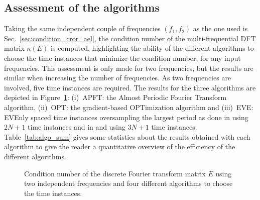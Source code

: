 \subsection{Assessment of the algorithms}
Taking the same independent couple of frequencies $(f_1, f_2)$ as the one
used is Sec.~\ref{sec:condition_cror_ael}, the condition number of the
multi-frequential DFT matrix $\kappa (E)$ is computed, highlighting
the ability of the different algorithms to choose the time instances that
minimize the condition number, for any input frequencies. This
assessment is only made for two frequencies, but the results are similar
when increasing the number of frequencies. As two frequencies are
involved, five time instances are required. The results for the three
algorithms are depicted in Figure~\ref{fig:bench_algo}: (i)~APFT: the
Almost Periodic Fourier Transform algorithm, (ii)~OPT: the
gradient-based OPTimization algorithm and (iii)~EVE: EVEnly spaced
time instances oversampling the largest period as done in
\citet{Gopinath2007} using $2N+1$ time
instances and in \citet{Ekici2007} and \citet{Ekici2008} using $3N+1$
time instances.
Table~\ref{tab:algo_sum} gives some statistics about the results obtained
with each algorithm to give the reader a quantitative overview of the
efficiency of the different algorithms.
\begin{figure}[htp]
  \centering 
  \caption{Condition number of the discrete Fourier transform matrix $E$
  using two independent frequencies and four different algorithms
  to choose the time instances.}
  \label{fig:bench_algo}
\end{figure}

